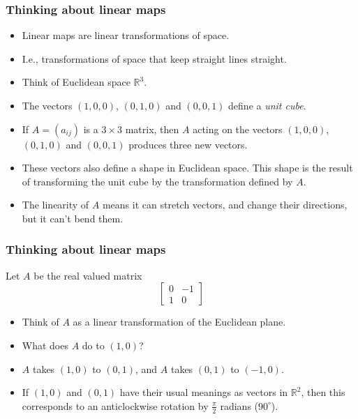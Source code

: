 \documentclass[handout]{beamer}
\newcommand{\bR}{\mathbb{R}}
\begin{document}
\begin{frame}
\frametitle{Thinking about linear maps}
\begin{itemize}
\item Linear maps are linear transformations of space. \vspace{0.2cm}
\item I.e., transformations of space that keep straight lines straight. \vspace{0.2cm}
\item Think of Euclidean space $\bR^3$. \vspace{0.2cm}
\item The vectors $(1,0,0)$, $(0,1,0)$ and $(0,0,1)$ define a \emph{unit cube}. \vspace{0.2cm}
\item If $A=(a_{ij})$ is a $3\times 3$ matrix, then $A$ acting on the vectors $(1,0,0)$, $(0,1,0)$ and $(0,0,1)$ produces three new vectors. \vspace{0.2cm}
\item These vectors also define a shape in Euclidean space. This shape is the result of transforming the unit cube by the transformation defined by $A$. \vspace{0.2cm}
\item The linearity of $A$ means it can stretch vectors, and change their directions, but it can't bend them.
\end{itemize} 
\end{frame}

\begin{frame}
\frametitle{Thinking about linear maps}
\begin{example}
Let $A$ be the real valued matrix
\[\begin{bmatrix}
0 & -1 \\
1 & 0
\end{bmatrix}\]

\begin{itemize} 
\item Think of $A$ as a linear transformation of the Euclidean plane. 
\item What does $A$ do to $(1,0)$?
\item $A$ takes $(1,0)$ to $(0,1)$, and $A$ takes $(0,1)$ to $(-1,0)$. 
\item If $(1,0)$ and $(0,1)$ have their usual meanings as vectors in $\bR^2$, then this corresponds to an anticlockwise rotation by $\frac{\pi}{2}$ radians ($90^\circ$).
\end{itemize}
\end{example}
\end{frame}
\end{document}
